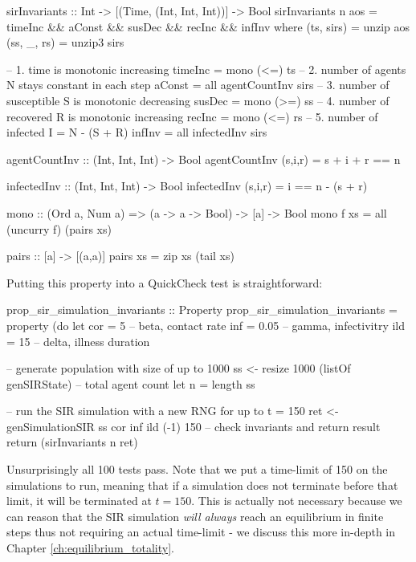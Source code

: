 \begin{HaskellCode}
sirInvariants :: Int -> [(Time, (Int, Int, Int))] -> Bool
sirInvariants n aos = timeInc && aConst && susDec && recInc && infInv
  where
    (ts, sirs)  = unzip aos
    (ss, _, rs) = unzip3 sirs

    -- 1. time is monotonic increasing
    timeInc = mono (<=)  ts
    -- 2. number of agents N stays constant in each step
    aConst = all agentCountInv sirs
    -- 3. number of susceptible S is monotonic decreasing
    susDec = mono (>=) ss
    -- 4. number of recovered R is monotonic increasing
    recInc = mono (<=)  rs
    -- 5. number of infected I = N - (S + R)
    infInv = all infectedInv sirs

    agentCountInv :: (Int, Int, Int) -> Bool
    agentCountInv (s,i,r) = s + i + r == n

    infectedInv :: (Int, Int, Int) -> Bool
    infectedInv (s,i,r) = i == n - (s + r)

    mono :: (Ord a, Num a) => (a -> a -> Bool) -> [a] -> Bool
    mono f xs = all (uncurry f) (pairs xs)

    pairs :: [a] -> [(a,a)]
    pairs xs = zip xs (tail xs)
\end{HaskellCode}

Putting this property into a QuickCheck test is straightforward:

\begin{HaskellCode}
prop_sir_simulation_invariants :: Property
prop_sir_simulation_invariants = property (do
  let cor = 5    -- beta, contact rate
      inf = 0.05 -- gamma, infectivitry
      ild = 15   -- delta, illness duration

  -- generate population with size of up to 1000
  ss <- resize 1000 (listOf genSIRState)
  -- total agent count
  let n = length ss

  -- run the SIR simulation with a new RNG for up to t = 150 
  ret <- genSimulationSIR ss cor inf ild (-1) 150
  -- check invariants and return result
  return (sirInvariants n ret)
\end{HaskellCode}

Unsurprisingly all 100 tests pass. Note that we put a time-limit of 150 on the simulations to run, meaning that if a simulation does not terminate before that limit, it will be terminated at $t=150$. This is actually not necessary because we can reason that the SIR simulation \textit{will always} reach an equilibrium in finite steps thus not requiring an actual time-limit - we discuss this more in-depth in Chapter \ref{ch:equilibrium_totality}.

